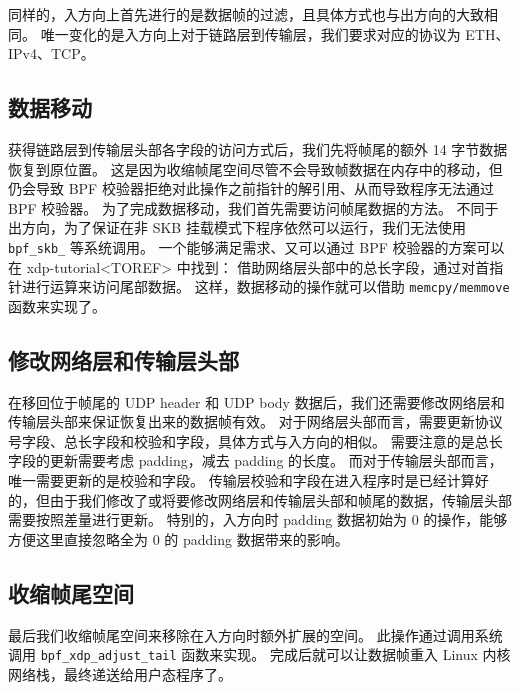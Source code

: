 同样的，入方向上首先进行的是数据帧的过滤，且具体方式也与出方向的大致相同。
唯一变化的是入方向上对于链路层到传输层，我们要求对应的协议为 ETH、IPv4、TCP。

\subsection{数据移动}

获得链路层到传输层头部各字段的访问方式后，我们先将帧尾的额外 14 字节数据恢复到原位置。
这是因为收缩帧尾空间尽管不会导致帧数据在内存中的移动，但仍会导致 BPF 校验器拒绝对此操作之前指针的解引用、从而导致程序无法通过 BPF 校验器。
为了完成数据移动，我们首先需要访问帧尾数据的方法。
不同于出方向，为了保证在非 SKB 挂载模式下程序依然可以运行，我们无法使用 \texttt{bpf\_skb\_\*} 等系统调用。
一个能够满足需求、又可以通过 BPF 校验器的方案可以在 xdp-tutorial<TOREF> 中找到：
借助网络层头部中的总长字段，通过对首指针进行运算来访问尾部数据。
这样，数据移动的操作就可以借助 \texttt{memcpy/memmove} 函数来实现了。

\subsection{修改网络层和传输层头部}

在移回位于帧尾的 UDP header 和 UDP body 数据后，我们还需要修改网络层和传输层头部来保证恢复出来的数据帧有效。
对于网络层头部而言，需要更新协议号字段、总长字段和校验和字段，具体方式与入方向的相似。
需要注意的是总长字段的更新需要考虑 padding，减去 padding 的长度。
而对于传输层头部而言，唯一需要更新的是校验和字段。
传输层校验和字段在进入程序时是已经计算好的，但由于我们修改了或将要修改网络层和传输层头部和帧尾的数据，传输层头部需要按照差量进行更新。
特别的，入方向时 padding 数据初始为 0 的操作，能够方便这里直接忽略全为 0 的 padding 数据带来的影响。

\subsection{收缩帧尾空间}

最后我们收缩帧尾空间来移除在入方向时额外扩展的空间。
此操作通过调用系统调用 \texttt{bpf\_xdp\_adjust\_tail} 函数来实现。
完成后就可以让数据帧重入 Linux 内核网络栈，最终递送给用户态程序了。
